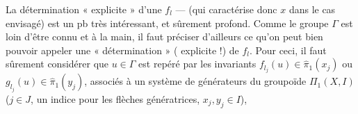 \documentclass[11pt,a4paper]{article}
\begin{document}
La détermination « explicite » d'une $f_l$ —  (qui caractérise donc $x$ dans le cas envisagé) est un pb très intéressant, et sûrement profond. Comme \struck{\ill{}} le groupe $\Gamma$  est loin d'être connu et à la main, il faut préciser d'ailleurs ce qu'on peut bien pouvoir appeler une « détermination » ( explicite !) de $f_l$. Pour ceci, il faut sûrement considérer que $u \in \Gamma$ est repéré par les invariants $f_{l_j}(u) \in \widehat{\pi}_1(x_j)$ ou $g_{l_j}(u) \in \widehat{\pi}_1(y_j)$, associés  à un système  de générateurs  du groupoïde $\Pi_1(X, I)$ ($j \in J$, un indice pour les flèches génératrices, $x_j, y_j \in I$),
\end{document}
